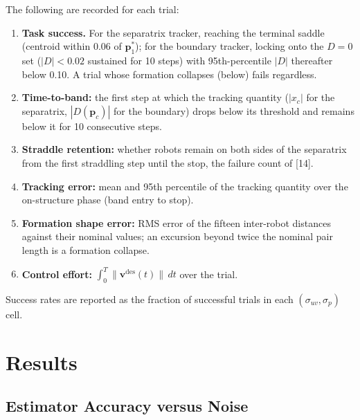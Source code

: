 \documentclass[lettersize,journal]{IEEEtran}
\begin{document}
The following are recorded for each trial:
\begin{enumerate}
    \item \textbf{Task success.} For the separatrix tracker, reaching
          the terminal saddle (centroid within 0.06 of
          $\mathbf{p}^*_1$); for the boundary tracker, locking onto the
          $D = 0$ set ($|D| < 0.02$ sustained for 10 steps) with
          95th-percentile $|D|$ thereafter below 0.10. A trial whose
          formation collapses (below) fails regardless.
    \item \textbf{Time-to-band:} the first step at which the tracking
          quantity ($|x_c|$ for the separatrix, $|D(\mathbf{p}_c)|$ for
          the boundary) drops below its threshold and remains below it
          for 10 consecutive steps.
    \item \textbf{Straddle retention:} whether robots remain on both
          sides of the separatrix from the first straddling step until
          the stop, the failure count of [14].
    \item \textbf{Tracking error:} mean and 95th percentile of the
          tracking quantity over the on-structure phase (band entry to
          stop).
    \item \textbf{Formation shape error:} RMS error of the fifteen
          inter-robot distances against their nominal values; an
          excursion beyond twice the nominal pair length is a formation
          collapse.
    \item \textbf{Control effort:} $\int_0^T \|\mathbf{v}^{\text{des}}(t)\|
          \,dt$ over the trial.
\end{enumerate}

Success rates are reported as the fraction of successful trials in each
$(\sigma_{uv}, \sigma_p)$ cell.


\section{Results}
\label{sec:results}

\subsection{Estimator Accuracy versus Noise}
\end{document}
